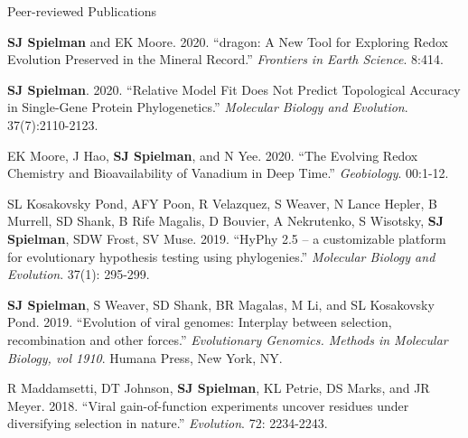 \documentclass{resume} %
\begin{document}
\vspace*{0.35cm}
\begin{rSection}{Peer-reviewed Publications}
\vspace*{0.25cm}

\begin{etaremune}[leftmargin=1.5em]

\item \textbf{SJ Spielman} and EK Moore. 2020. ``dragon: A New Tool for Exploring Redox Evolution Preserved in the Mineral Record.'' \emph{Frontiers in Earth Science}. 8:414.

\item \textbf{SJ Spielman}. 2020. ``Relative Model Fit Does Not Predict Topological Accuracy in Single-Gene Protein Phylogenetics.'' \emph{Molecular Biology and Evolution}. 37(7):2110-2123.

\item EK Moore, J Hao, \textbf{SJ Spielman}, and N Yee. 2020. ``The Evolving Redox Chemistry and Bioavailability of Vanadium in Deep Time.'' \emph{Geobiology}. 00:1-12.

\item SL Kosakovsky Pond, AFY Poon, R Velazquez, S Weaver, N Lance Hepler, B Murrell, SD Shank, B Rife Magalis, D Bouvier, A Nekrutenko, S Wisotsky, \textbf{SJ Spielman}, SDW Frost, SV Muse. 2019. ``HyPhy 2.5 – a customizable platform for evolutionary hypothesis testing using phylogenies.'' \emph{Molecular Biology and Evolution}. 37(1): 295-299.

\item \textbf{SJ Spielman}, S Weaver, SD Shank, BR Magalas, M Li, and SL Kosakovsky Pond. 2019. ``Evolution of viral genomes: Interplay between selection, recombination and other forces.'' \emph{Evolutionary Genomics. Methods in Molecular Biology, vol 1910}. Humana Press, New York, NY.

\item R Maddamsetti, DT Johnson, \textbf{SJ Spielman}, KL Petrie, DS Marks, and JR Meyer. 2018. ``Viral gain-of-function experiments uncover residues under diversifying selection in nature.'' \emph{Evolution}. 72: 2234-2243.


\end{etaremune}
\end{rSection}
\end{document}
